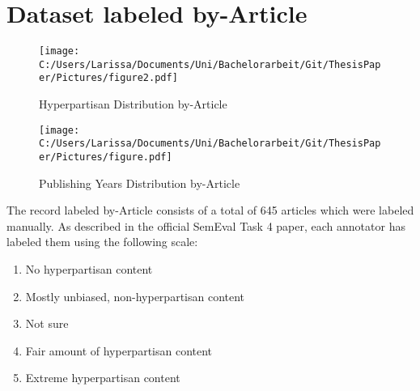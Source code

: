 \documentclass[a4paper, 11pt,titlepage,oneside,openany]{book}
\begin{document}

\newpage
\section{Dataset labeled by-Article}
\begin{figure}[h]
	\begin{minipage}{.45\linewidth}
		\texttt{[image: C:/Users/Larissa/Documents/Uni/Bachelorarbeit/Git/ThesisPaper/Pictures/figure2.pdf]}
		\caption{Hyperpartisan Distribution by-Article}
	\end{minipage}
	\hspace{.1\linewidth}%
	\begin{minipage}{.45\linewidth}
		\texttt{[image: C:/Users/Larissa/Documents/Uni/Bachelorarbeit/Git/ThesisPaper/Pictures/figure.pdf]}
		\caption{Publishing Years Distribution by-Article}
	\end{minipage}
\end{figure}
The record labeled by-Article consists of a total of 645 articles which were labeled manually. As described in the official SemEval Task 4 paper, each annotator has labeled them using the following scale:
\begin{enumerate}
	\item No hyperpartisan content
	\item Mostly unbiased, non-hyperpartisan content
	\item Not sure
	\item Fair amount of hyperpartisan content
	\item Extreme hyperpartisan content
\end{enumerate}
\end{document}
